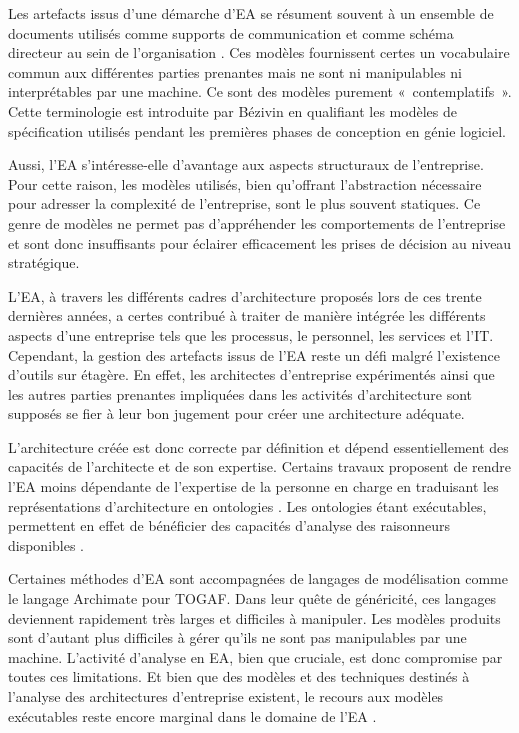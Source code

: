 Les artefacts issus d'une démarche d'EA se résument souvent à un ensemble de
documents utilisés comme supports de communication et comme schéma directeur au
sein de l'organisation \cite{kulkarni_modelling_2013}
\cite{clark_towards_2014}.  Ces modèles fournissent certes un vocabulaire
commun aux différentes parties prenantes mais ne sont	 ni manipulables ni
interprétables par une machine. Ce sont des modèles purement «~contemplatifs~».
Cette terminologie est introduite par Bézivin \cite{bezivin_towards_2001} en qualifiant les modèles de spécification utilisés pendant les premières phases de conception en génie
logiciel. 

Aussi, l'EA s'intéresse-elle d'avantage aux aspects structuraux de
l'entreprise. Pour cette raison, les modèles utilisés, bien qu'offrant
l'abstraction nécessaire pour adresser la complexité de l'entreprise, sont le
plus souvent statiques. Ce genre de modèles ne permet pas d'appréhender les
comportements de l'entreprise et sont donc insuffisants pour éclairer
efficacement les prises de décision au niveau stratégique.

L'EA, à travers les différents cadres d'architecture proposés lors de ces trente
dernières années, a certes contribué à traiter de manière intégrée les
différents aspects d'une entreprise tels que les processus, le personnel, les
services et l'IT. Cependant, la gestion des artefacts issus de l'EA reste un
défi malgré l'existence d'outils sur étagère. En effet, les architectes d'entreprise expérimentés ainsi que les autres parties prenantes impliquées dans les activités
d'architecture sont supposés se fier à leur bon jugement pour créer une
architecture adéquate. 

L'architecture créée est donc correcte par définition et dépend essentiellement
des capacités de l'architecte et de son expertise. Certains travaux proposent de
rendre l'EA moins dépendante de l'expertise de la personne en charge en traduisant les représentations d'architecture en ontologies \cite{sunkle_analyzing_2013}. Les ontologies étant exécutables, permettent en effet de bénéficier des capacités d'analyse des raisonneurs disponibles .

Certaines méthodes d'EA sont accompagnées de langages de modélisation comme le langage
Archimate pour TOGAF. Dans leur quête de généricité, ces langages deviennent rapidement
très larges et difficiles à manipuler. Les modèles produits sont d'autant plus
difficiles à gérer qu'ils ne sont pas manipulables par une machine. L'activité
d'analyse en EA, bien que cruciale, est donc compromise par toutes ces
limitations. Et bien que des modèles et des techniques destinés à l'analyse des
architectures d'entreprise existent, le recours aux modèles exécutables
reste encore marginal dans le domaine de l'EA \cite{kulkarni2013modelling}.

